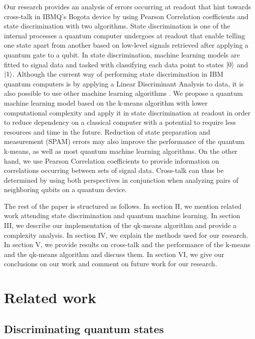 \documentclass[conference]{IEEEtran}
\begin{document}
Our research provides an analysis of errors occurring at readout that hint towards cross-talk in IBMQ's Bogota device by using Pearson Correlation coefficients and state discrimination with two algorithms. State discrimination is one of the internal processes a quantum computer undergoes at readout that enable telling one state apart from another based on low-level signals retrieved after applying a quantum gate to a qubit. In state discrimination, machine learning models are fitted to signal data and tasked with classifying each data point to states \(\ket{0}\) and \(\ket{1}\). Although the current way of performing state discrimination in IBM quantum computers is by applying a Linear Discriminant Analysis to data, it is also possible to use other machine learning algorithms \cite{Magesan_2015}\cite{Alexander_2020}. We propose a quantum machine learning model based on the k-means algorithm with lower computational complexity and apply it in state discrimination at readout in order to reduce dependency on a classical computer with a potential to require less resources and time in the future. Reduction of state preparation and measurement (SPAM) errors may also improve the performance of the quantum k-means, as well as most quantum machine learning algorithms. On the other hand, we use Pearson Correlation coefficients to provide information on correlations occurring between sets of signal data. Cross-talk can thus be determined by using both perspectives in conjunction when analyzing pairs of neighboring qubits on a quantum device.

The rest of the paper is structured as follows. In section II, we mention related work attending state discrimination and quantum machine learning. In section III, we describe our implementation of the qk-means algorithm and provide a complexity analysis. In section IV, we explain the methods used for our research. In section V, we provide results on cross-talk and the performance of the k-means and the qk-means algorithm and discuss them. In section VI, we give our conclusions on our work and comment on future work for our research.

\section{Related work}

\subsection{Discriminating quantum states}
\end{document}
